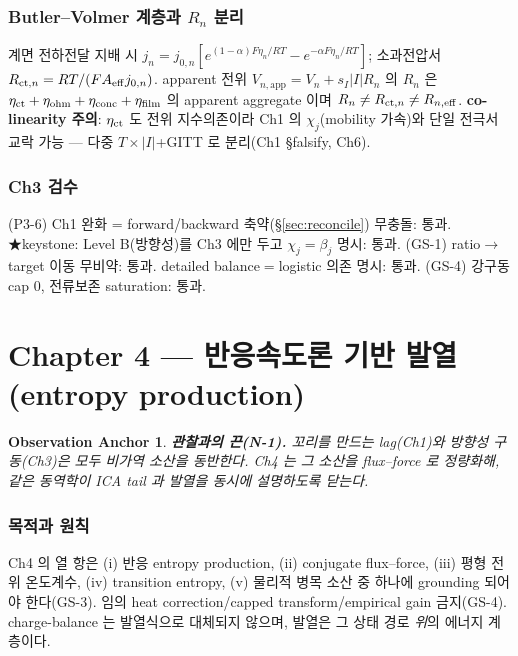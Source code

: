 \documentclass[11pt,a4paper]{article}
\newtheorem*{anchorbox}{Observation Anchor}
\newcommand{\eff}{\mathrm{eff}}\newcommand{\eq}{\mathrm{eq}}\newcommand{\app}{\mathrm{app}}
\begin{document}
\section{Butler--Volmer 계층과 $R_n$ 분리}\label{sec:ch3_Rn}
계면 전하전달 지배 시 $j_n=j_{0,n}[e^{(1-\alpha)F\eta_n/RT}-e^{-\alpha F\eta_n/RT}]$; 소과전압서
$R_{\ct,n}=RT/(FA_\eff j_{0,n})$. apparent 전위
$V_{n,\app}=V_n+s_I|I|R_n$ 의 $R_n$ 은 $\eta_{\mathrm{ct}}+\eta_{\mathrm{ohm}}+\eta_{\mathrm{conc}}+\eta_{\mathrm{film}}$
의 apparent aggregate 이며 $R_n\ne R_{\ct,n}\ne R_{n,\eff}$. \textbf{co-linearity 주의}: $\eta_{\mathrm{ct}}$
도 전위 지수의존이라 Ch1 의 $\chi_j$(mobility 가속)와 단일 전극서 교락 가능 — 다중 $T\times|I|$+GITT 로
분리(Ch1 \S falsify, Ch6).

\section{Ch3 검수}\label{sec:ch3_check}
{\small (P3-6) Ch1 완화 = forward/backward 축약(\S\ref{sec:reconcile}) 무충돌: 통과. ★keystone:
Level B(방향성)를 Ch3 에만 두고 $\chi_j=\beta_j$ 명시: 통과. (GS-1) ratio$\to$target 이동 무비약:
통과. detailed balance$=$logistic 의존 명시: 통과. (GS-4) 강구동 cap 0, 전류보존 saturation: 통과.}

\part*{Chapter 4 — 반응속도론 기반 발열 (entropy production)}
\setcounter{section}{0}

\begin{anchorbox}
\textbf{관찰과의 끈(N-1).} 꼬리를 만드는 lag(Ch1)와 방향성 구동(Ch3)은 모두 \emph{비가역 소산}을
동반한다. Ch4 는 그 소산을 flux--force 로 정량화해, 같은 동역학이 ICA tail 과 발열을 동시에
설명하도록 닫는다.
\end{anchorbox}

\section{목적과 원칙}\label{sec:ch4_scope}
Ch4 의 열 항은 (i) 반응 entropy production, (ii) conjugate flux--force, (iii) 평형 전위 온도계수,
(iv) transition entropy, (v) 물리적 병목 소산 중 하나에 grounding 되어야 한다(GS-3). 임의 heat
correction/capped transform/empirical gain 금지(GS-4). charge-balance 는 발열식으로 대체되지 않으며,
발열은 그 상태 경로 \emph{위}의 에너지 계층이다.
\end{document}

